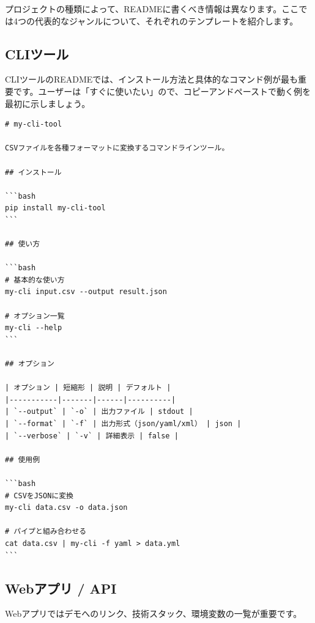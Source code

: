 プロジェクトの種類によって、READMEに書くべき情報は異なります。ここでは4つの代表的なジャンルについて、それぞれのテンプレートを紹介します。

\subsection{CLIツール}

CLIツールのREADMEでは、インストール方法と具体的なコマンド例が最も重要です。ユーザーは「すぐに使いたい」ので、コピーアンドペーストで動く例を最初に示しましょう。

\begin{lstlisting}[language={}]
# my-cli-tool

CSVファイルを各種フォーマットに変換するコマンドラインツール。

## インストール

```bash
pip install my-cli-tool
```

## 使い方

```bash
# 基本的な使い方
my-cli input.csv --output result.json

# オプション一覧
my-cli --help
```

## オプション

| オプション | 短縮形 | 説明 | デフォルト |
|-----------|-------|------|----------|
| `--output` | `-o` | 出力ファイル | stdout |
| `--format` | `-f` | 出力形式（json/yaml/xml） | json |
| `--verbose` | `-v` | 詳細表示 | false |

## 使用例

```bash
# CSVをJSONに変換
my-cli data.csv -o data.json

# パイプと組み合わせる
cat data.csv | my-cli -f yaml > data.yml
```
\end{lstlisting}

\subsection{Webアプリ / API}

Webアプリではデモへのリンク、技術スタック、環境変数の一覧が重要です。

